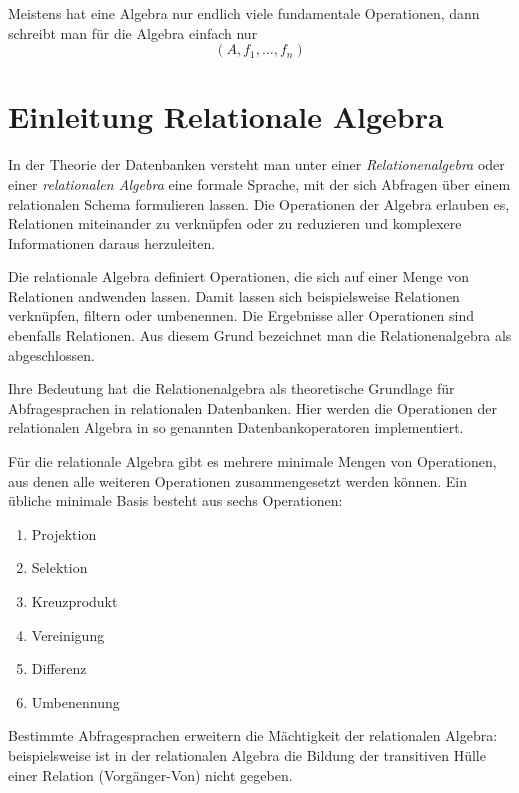 \documentclass{scrbook}
\begin{document}
\noindent
Meistens hat eine Algebra nur endlich viele fundamentale Operationen,
dann schreibt man für die Algebra einfach nur
\begin{displaymath} 
(A, f_1, \dots, f_n)
\end{displaymath}


\section{Einleitung Relationale Algebra}

In der Theorie der Datenbanken versteht man unter einer
\emph{Relationenalgebra} oder einer \emph{relationalen Algebra} eine formale Sprache,
mit der sich Abfragen über einem relationalen Schema formulieren lassen.
Die Operationen der Algebra erlauben es, Relationen miteinander zu verknüpfen 
oder zu reduzieren und komplexere Informationen daraus herzuleiten.

Die relationale Algebra definiert Operationen, die sich auf einer Menge von Relationen
andwenden lassen.
Damit lassen sich beispielsweise Relationen verknüpfen, filtern oder umbenennen.
Die Ergebnisse aller Operationen sind ebenfalls Relationen.
Aus diesem Grund bezeichnet man die Relationenalgebra als 
abgeschlossen. %

Ihre Bedeutung hat die Relationenalgebra als theoretische Grundlage für 
Abfragesprachen in relationalen Datenbanken.
Hier werden die Operationen der relationalen Algebra in so genannten 
Datenbankoperatoren implementiert.

Für die relationale Algebra gibt es mehrere minimale Mengen von Operationen,
aus denen alle weiteren Operationen zusammengesetzt werden können.
Ein übliche minimale Basis besteht aus sechs Operationen:
\begin{enumerate}
\item Projektion
\item Selektion
\item Kreuzprodukt
\item Vereinigung
\item Differenz
\item Umbenennung
\end{enumerate}

Bestimmte Abfragesprachen erweitern die Mächtigkeit der relationalen Algebra:
beispielsweise ist in der relationalen Algebra die Bildung der transitiven Hülle
einer Relation (Vorgänger-Von) nicht gegeben.
\end{document}
